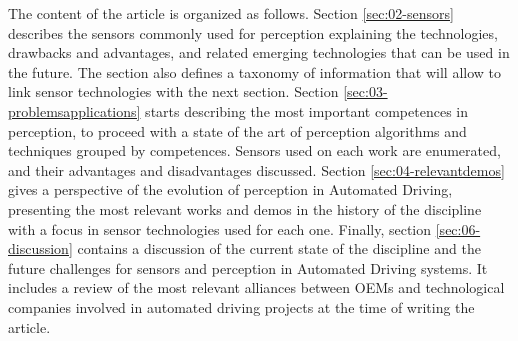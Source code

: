 The content of the article is organized as follows. Section 
\ref{sec:02-sensors} describes the sensors commonly used for perception 
explaining the technologies, drawbacks and advantages, and related emerging 
technologies that can be used in the future. The section also defines a 
taxonomy of information that will allow to link sensor technologies with the 
next section.
Section \ref{sec:03-problemsapplications} starts describing the most important 
competences in perception, to proceed with a state of the art of perception 
algorithms and techniques grouped by competences. Sensors used on each work
are enumerated, and their advantages and disadvantages discussed. 
Section \ref{sec:04-relevantdemos} gives a perspective of the evolution of
perception in Automated Driving, presenting the most relevant works and demos
in the history of the discipline with a focus in sensor technologies used for
each one. 
Finally, section \ref{sec:06-discussion} contains a discussion of the current
state of the discipline and the future challenges for sensors and perception in
Automated Driving systems. It includes a review of the most relevant alliances 
between OEMs and technological companies involved in automated driving projects
at the time of writing the article.
